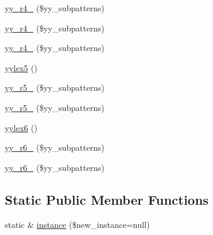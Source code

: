 \begin{DoxyCompactItemize}
\hyperlink{class_smarty___internal___configfilelexer_ada21833cfbd75b7b36b919011578613a}{yy\+\_\+r4\+\_} (\$yy\+\_\+subpatterns)
\item 
\hyperlink{class_smarty___internal___configfilelexer_a7f29a073e7315189436802f41a3c1997}{yy\+\_\+r4\+\_} (\$yy\+\_\+subpatterns)
\item 
\hyperlink{class_smarty___internal___configfilelexer_af48efa082ee952015434c5c365c47fe4}{yy\+\_\+r4\+\_} (\$yy\+\_\+subpatterns)
\item 
\hyperlink{class_smarty___internal___configfilelexer_aed156472bed2d8b0954c9f966b4a0b97}{yylex5} ()
\item 
\hyperlink{class_smarty___internal___configfilelexer_a0b5258696fc1bbb7461496966b9dc3d9}{yy\+\_\+r5\+\_} (\$yy\+\_\+subpatterns)
\item 
\hyperlink{class_smarty___internal___configfilelexer_a082bf0d266433f1aabfb656f98f21549}{yy\+\_\+r5\+\_} (\$yy\+\_\+subpatterns)
\item 
\hyperlink{class_smarty___internal___configfilelexer_a804dbcede2ce458dd315ccccd773bf4b}{yylex6} ()
\item 
\hyperlink{class_smarty___internal___configfilelexer_ab7c9ba16647f9993f2a721022d27aae3}{yy\+\_\+r6\+\_} (\$yy\+\_\+subpatterns)
\item 
\hyperlink{class_smarty___internal___configfilelexer_af9dd672750c2b7a831b8aa3d8ba192cf}{yy\+\_\+r6\+\_} (\$yy\+\_\+subpatterns)
\end{DoxyCompactItemize}
\subsection*{Static Public Member Functions}
\begin{DoxyCompactItemize}
\item 
static \& \hyperlink{class_smarty___internal___configfilelexer_af31b488c68b8389658490fcccb8af0a1}{instance} (\$new\+\_\+instance=null)
\end{DoxyCompactItemize}
